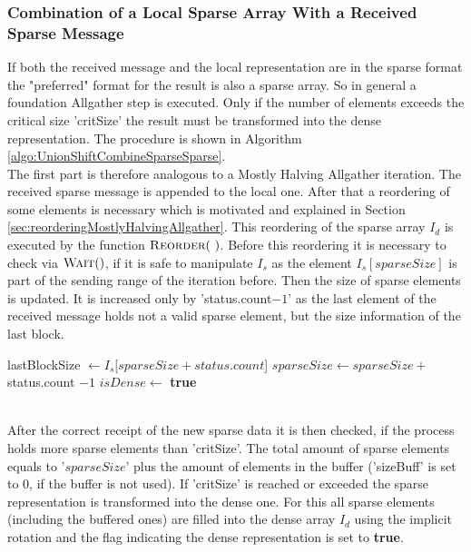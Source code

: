 \subsubsection{Combination of a Local Sparse Array With a Received Sparse Message}
If both the received message and the local representation are in the sparse format the "preferred" format for the result is also a sparse array. So in general a foundation Allgather step is executed. Only if the number of elements exceeds the critical size 'critSize' the result must be transformed into the dense representation. The procedure is shown in Algorithm \ref{algo:UnionShiftCombineSparseSparse}. \\
The first part is therefore analogous to a Mostly Halving Allgather iteration. The received sparse message is appended to the local one. After that a reordering of some elements is necessary which is motivated and explained in Section \ref{sec:reorderingMostlyHalvingAllgather}. This reordering of the sparse array $I_d$ is executed by the function $\Call{Reorder}{~}$. Before this reordering it is necessary to check via $\Call{Wait}$, if it is safe to manipulate $I_s$ as the element $I_s[sparseSize]$ is part of the sending range of the iteration before. Then the size of sparse elements is updated. It is increased only by 'status.count$-1$' as the last element of the received message holds not a valid sparse element, but the size information of the last block.
\begin{algorithm}[htb]
	\caption{Combine local sparse array with a received sparse array.} \label{algo:UnionShiftCombineSparseSparse}
	\begin{algorithmic}[1]
	\State  {}
	\State {}
	\State lastBlockSize $\gets I_s[sparseSize+status.count$] 
	\Statex{}
	\State{}
	\State $sparseSize \gets sparseSize + $ status.count $-1$
	\label{UnionShiftCombineSparseSparse:addSizeBuff}
			\State {}
		\EndFor
				\State {}
			\EndFor
		\EndIf	
		\State $isDense \gets$ \textbf{true}	
	\EndIf
	\EndProcedure
	\end{algorithmic}
\end{algorithm} 
\\After the correct receipt of the new sparse data it is then checked, if the process holds more sparse elements than 'critSize'. The total amount of sparse elements equals to '$sparseSize$' plus the amount of elements in the buffer ('sizeBuff' is set to 0, if the buffer is not used). If 'critSize' is reached or exceeded the sparse representation is transformed into the dense one. For this all sparse elements (including the buffered ones) are filled into the dense array $I_d$ using the implicit rotation and the flag indicating the dense representation is set to \textbf{true}.


